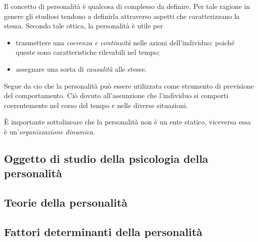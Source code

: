 \documentclass{subfiles}
\begin{document}
Il concetto di personalità è qualcosa di complesso da definire.
Per tale ragione in genere gli studiosi tendono a definirla attraverso aspetti che caratterizzano la stessa.
Secondo tale ottica, la personalità è utile per
\begin{itemize}
    \item trasmettere una \emph{coerenza \emph{e} continuità} nelle azioni dell'individuo: poiché queste sono caratteristiche rilevabili nel tempo;
    \item assegnare una sorta di \emph{causalità} alle stesse.
\end{itemize}
Segue da cio che la personalità può essere utilizzata come strumento di previsione del comportamento.
Ciò dovuto all'assunzione che l'individuo si comporti coerentemente nel corso del tempo e nelle diverse situazioni.

\begin{Remark*}
    \`E importante sottolineare che la personalità non è un ente statico, viceversa essa è un'\emph{organizzazione dinamica}.
\end{Remark*}

\subsection{Oggetto di studio della psicologia della personalità}


\subsection{Teorie della personalità}


\subsection{Fattori determinanti della personalità}

\end{document}

